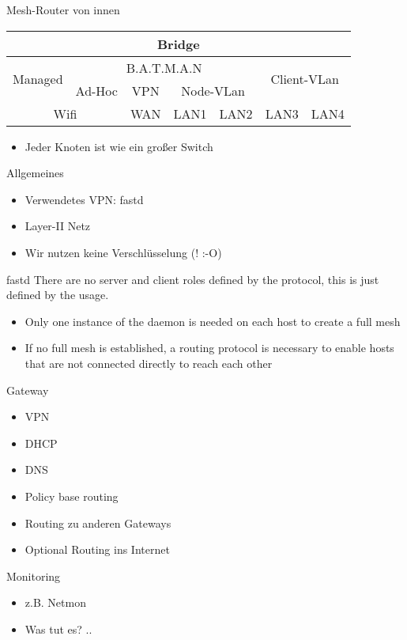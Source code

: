 \begin{frame}{Mesh-Router von innen}
    \renewcommand{\arraystretch}{1.5}
    \begin{tabular}{|c|c|c|c|c|c|c|} \hline
         \multicolumn{7}{|c|}{Bridge} \\ \hline
         \multirow{2}{*}{Managed} &
         \multicolumn{4}{c|}{B.A.T.M.A.N} &
         \multicolumn{2}{c|}{\multirow{2}{*}{Client-VLan}} \\ \cline{2-5}
         & Ad-Hoc & VPN & \multicolumn{2}{c|}{Node-VLan} & \multicolumn{2}{c|}{} \\ \hline
         \multicolumn{2}{|c|}{Wifi} & WAN & LAN1 & LAN2 &
         LAN3 & LAN4 \\ \hline
    \end{tabular}

    \begin{itemize}
        \item Jeder Knoten ist wie ein großer Switch
    \end{itemize}
\end{frame}

\begin{frame}{Allgemeines}
    \begin{itemize}
        \item Verwendetes VPN: fastd
        \item Layer-II Netz
        \item Wir nutzen keine Verschlüsselung (! :-O)
    \end{itemize}
    \begin{block}{fastd}
        There are no server and client roles defined by the
        protocol, this is just defined by the usage.
        \begin{itemize}
            \item Only one instance of the daemon is needed on each
                host to create a full mesh
            \item If no full mesh is established, a routing protocol
                is necessary to enable hosts that are not connected
                directly to reach each other
        \end{itemize}
    \end{block}
\end{frame}

\begin{frame}{Gateway}
    \begin{itemize}
        \item VPN
        \item DHCP
        \item DNS
        \item Policy base routing
        \item Routing zu anderen Gateways
        \item Optional Routing ins Internet
    \end{itemize}
\end{frame}

\begin{frame}{Monitoring}
    \begin{itemize}
        \item z.B. Netmon
        \item Was tut es? ..
    \end{itemize}
\end{frame}
